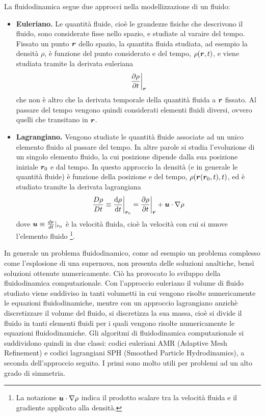 La fluidodinamica segue due approcci nella modellizzazione di un fluido:
\begin{itemize}
\item \textbf{Euleriano.} Le quantità fluide, cioè le grandezze fisiche che descrivono il fluido, sono considerate fisse nello spazio, e studiate al varaire del tempo. Fissato un punto $\V{r}$ dello spazio, la quantita fluida studiata, ad esempio la densità $\rho$, è funzione del punto considerato e del tempo, $\rho(\V{r}, t)$, e viene studiata tramite la derivata euleriana
\begin{equation}
\frac{\partial \rho}{\partial t}\bigg\vert_{\V{r}}
\end{equation}
che non è altro che la derivata temporale della quantità fluida a $\V{r}$ fissato. Al passare del tempo vengono quindi considerati elementi fluidi diversi, ovvero quelli che transitano in $\V{r}$.
\item \textbf{Lagrangiano.} Vengono studiate le quantità fluide associate ad un unico elemento fluido al passare del tempo. In altre parole si studia l'evoluzione di un singolo elemento fluido, la cui posizione dipende dalla sua posizione iniziale $\V{r}_0$ e dal tempo. In questo approccio la densità (e in generale le quantità fluide) è funzione della posizione e del tempo, $\rho(\V{r}(\V{r}_0,t), t)$, ed è studiato tramite la derivata lagrangiana
\begin{equation}
\frac{D \rho}{D t} \equiv \der{\rho}{t}\bigg\vert_{\V{r}_0} = \frac{\partial \rho}{\partial t}\bigg\vert_{\V{r}} + \V{u}\cdot \V{\nabla}\rho \label{eq:DerivataLagrangiana}
\end{equation}
dove $\V{u}\equiv \frac{d\V{r}}{dt}|_{r_0}$ è la velocità fluida, cioè la velocità con cui si muove l'elemento fluido \footnote{La notazione $\V{u}\cdot \V{\nabla}\rho$ indica il prodotto scalare tra la velocità fluida e il gradiente applicato alla densità.}.
\end{itemize}
In generale un problema fluidodinamico, come ad esempio un problema complesso come l'esplosione di una supernova, non presenta delle soluzioni analtiche, bensì soluzioni ottenute numericamente. Ciò ha provocato lo sviluppo della fluidodinamica computazionale. Con l'approccio euleriano il volume di fluido studiato viene suddiviso in tanti volumetti in cui vengono risolte numericamente le equazioni fluidodinamiche, mentre con un approccio lagrangiano anzichè discretizzare il volume del fluido, si discretizza la sua massa, cioè si divide il fluido in tanti elementi fluidi per i quali vengono risolte numericamente le equazioni fluidodinamiche. Gli algoritmi di fluidodinamica computazionale si suddividono quindi in due classi: codici euleriani AMR (Adaptive Mesh Refinement) e codici lagrangiani SPH (Smoothed Particle Hydrodinamics), a seconda dell'approccio seguito. I primi sono molto utili per problemi ad un alto grado di simmetria.

